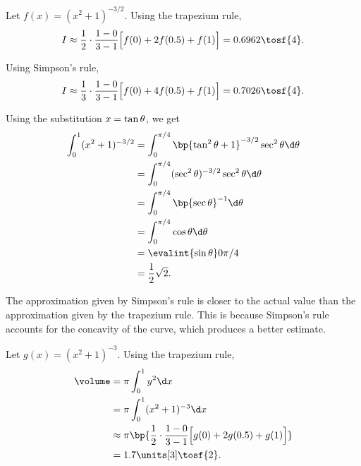 \begin{solution}
    \begin{ppart}
        Let $f(x) = (x^2 + 1)^{-3/2}$. Using the trapezium rule, \[I \approx \frac12 \cdot \frac{1 - 0}{3 -1} \Big[f(0) + 2f(0.5) + f(1)\Big] = 0.6962 \tosf{4}.\]

        Using Simpson's rule, \[I \approx \frac13 \cdot \frac{1 - 0}{3 -1} \Big[f(0) + 4f(0.5) + f(1)\Big] = 0.7026 \tosf{4}.\]
    \end{ppart}
    \begin{ppart}
        Using the substitution $x = \tan \theta$, we get
        \begin{align*}
            \int_0^1 (x^2 + 1)^{-3/2} &= \int_0^{\pi/4} \bp{\tan^2 \t + 1}^{-3/2} \sec^2 \t \d \t\\
            &= \int_0^{\pi/4} (\sec^2 \t)^{-3/2} \sec^2 \t \d \t\\
            &= \int_0^{\pi/4} \bp{\sec \t}^{-1} \d \t\\
            &= \int_0^{\pi/4} \cos \t \d \t\\
            &= \evalint{\sin \t}0{\pi/4}\\
            &= \frac12 \sqrt2.
        \end{align*}

        The approximation given by Simpson's rule is closer to the actual value than the approximation given by the trapezium rule. This is because Simpson's rule accounts for the concavity of the curve, which produces a better estimate.
    \end{ppart}
    \begin{ppart}
        Let $g(x) = (x^2 + 1)^{-3}$. Using the trapezium rule,
        \begin{align*}
            \volume &= \pi \int_0^1 y^2 \d x\\
            &= \pi \int_0^1 (x^2 + 1)^{-3} \d x\\
            &\approx \pi \bp{\frac12 \cdot \frac{1- 0}{3 - 1} \Big[g(0) + 2g(0.5) + g(1)\Big]}\\
            &= 1.7 \units[3] \tosf{2}.
        \end{align*}
    \end{ppart}
\end{solution}

